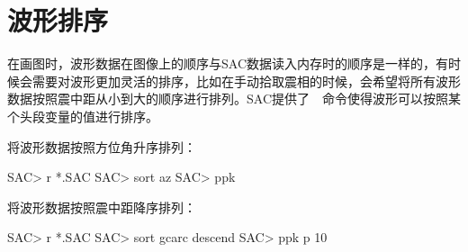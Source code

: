 \section{波形排序}
在画图时，波形数据在图像上的顺序与SAC数据读入内存时的顺序是一样的，有时候会需要对波形更加灵活的排序，比如在手动拾取震相的时候，会希望将所有波形数据按照震中距从小到大的顺序进行排列。SAC提供了~~命令使得波形可以按照某个头段变量的值进行排序。

将波形数据按照方位角升序排列：
\begin{SACCode}
SAC> r *.SAC
SAC> sort az
SAC> ppk
\end{SACCode}

将波形数据按照震中距降序排列：
\begin{SACCode}
SAC> r *.SAC
SAC> sort gcarc descend
SAC> ppk p 10
\end{SACCode}
